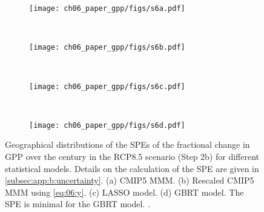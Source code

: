 \begin{figure}[p]
  \centering
  \begin{subfigure}[b]{\SubfigureWidth{}}
    \texttt{[image: ch06\_paper\_gpp/figs/s6a.pdf]}
    \caption{}
    \label{fig:app:b:step2b_results_errors:a}
  \end{subfigure}
  ~
  \begin{subfigure}[b]{\SubfigureWidth{}}
    \texttt{[image: ch06\_paper\_gpp/figs/s6b.pdf]}
    \caption{}
    \label{fig:app:b:step2b_results_errors:b}
  \end{subfigure}
  \\
  \begin{subfigure}[b]{\SubfigureWidth{}}
    \texttt{[image: ch06\_paper\_gpp/figs/s6c.pdf]}
    \caption{}
    \label{fig:app:b:step2b_results_errors:c}
  \end{subfigure}
  ~
  \begin{subfigure}[b]{\SubfigureWidth{}}
    \texttt{[image: ch06\_paper\_gpp/figs/s6d.pdf]}
    \caption{}
    \label{fig:app:b:step2b_results_errors:d}
  \end{subfigure}
  \caption[
    Geographical distributions of the \aclp{SPE} of the fractional change in
    \acf{GPP} over the  century in the \acs{RCP}8.5 scenario (Step 2b)
    for different statistical models.
  ]{
    Geographical distributions of the \acfp{SPE} of the fractional change in
    \acf{GPP} over the  century in the \acs{RCP}8.5 scenario (Step 2b)
    for different statistical models. Details on the calculation of the
    \acs{SPE} are given in \cref{subsec:app:b:uncertainty}. (a) \acs{CMIP}5
    \acf{MMM}. (b) Rescaled \acs{CMIP}5 \acs{MMM} using \cref{eq:06:y}. (c)
    \Acf{LASSO} model. (d) \Acf{GBRT} model. The \acs{SPE} is minimal for the
    \acs{GBRT} model. .
  }
  \label{fig:app:b:step2b_results_errors}
\end{figure}


\endgroup
